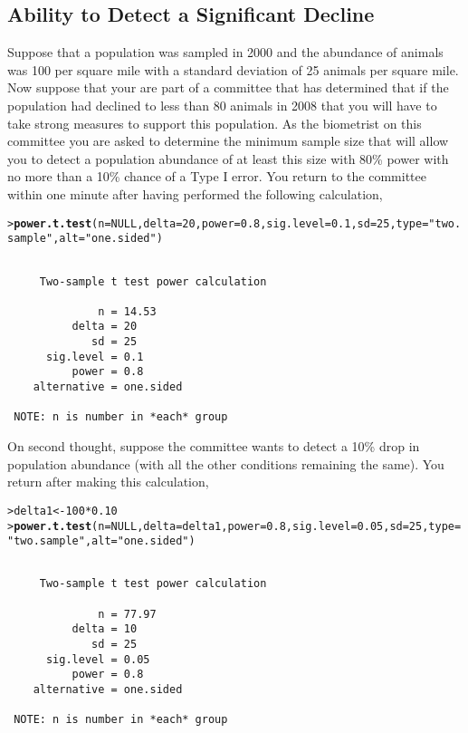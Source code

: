 \documentclass{article}\usepackage{graphicx, color}
\makeatletter
\newcommand{\hlfunctioncall}[1]{\textcolor[rgb]{0.501960784313725,0,0.329411764705882}{\textbf{#1}}}%
\newcommand{\hlstring}[1]{\textcolor[rgb]{0.6,0.6,1}{#1}}%
\newenvironment{kframe}{%
 \def\at@end@of@kframe{}%
 \ifinner\ifhmode%
  \def\at@end@of@kframe{\end{minipage}}%
  \begin{minipage}{\columnwidth}%
 \fi\fi%
 \def\FrameCommand##1{\hskip\@totalleftmargin \hskip-\fboxsep
 \colorbox{shadecolor}{##1}\hskip-\fboxsep
     \hskip-\linewidth \hskip-\@totalleftmargin \hskip\columnwidth}%
 \MakeFramed {\advance\hsize-\width
   \@totalleftmargin\z@ \linewidth\hsize
   \@setminipage}}%
 {\par\unskip\endMakeFramed%
 \at@end@of@kframe}
\newenvironment{knitrout}{}{} %
\makeatother
\begin{document}
\subsection{Ability to Detect a Significant Decline}
Suppose that a population was sampled in 2000 and the abundance of animals was 100 per square mile with a standard deviation of 25 animals per square mile.  Now suppose that your are part of a committee that has determined that if the population had declined to less than 80 animals in 2008 that you will have to take strong measures to support this population.  As the biometrist on this committee you are asked to determine the minimum sample size that will allow you to detect a population abundance of at least this size with 80\% power with no more than a 10\% chance of a Type I error.  You return to the committee within one minute after having performed the following calculation,
\begin{knitrout}
\color{fgcolor}\begin{kframe}
\begin{alltt}
> \hlfunctioncall{power.t.test}(n=NULL,delta=20,power=0.8,sig.level=0.1,sd=25,type=\hlstring{"two.sample"},alt=\hlstring{"one.sided"})
\end{alltt}
\begin{verbatim}

     Two-sample t test power calculation 

              n = 14.53
          delta = 20
             sd = 25
      sig.level = 0.1
          power = 0.8
    alternative = one.sided

 NOTE: n is number in *each* group 
\end{verbatim}
\end{kframe}
\end{knitrout}


On second thought, suppose the committee wants to detect a 10\% drop in population abundance (with all the other conditions remaining the same).  You return after making this calculation,
\begin{knitrout}
\color{fgcolor}\begin{kframe}
\begin{alltt}
> delta1 <- 100*0.10
> \hlfunctioncall{power.t.test}(n=NULL,delta=delta1,power=0.8,sig.level=0.05,sd=25,type=\hlstring{"two.sample"},alt=\hlstring{"one.sided"})
\end{alltt}
\begin{verbatim}

     Two-sample t test power calculation 

              n = 77.97
          delta = 10
             sd = 25
      sig.level = 0.05
          power = 0.8
    alternative = one.sided

 NOTE: n is number in *each* group 
\end{verbatim}
\end{kframe}
\end{knitrout}
\end{document}
